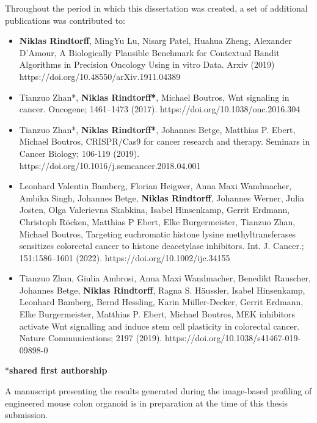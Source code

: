 \begin{flushleft}
Throughout the period in which this dissertation was created, a set of additional publications was contributed to: 
\begin{itemize} 
    \item \textbf{Niklas Rindtorff}, MingYu Lu, Nisarg Patel, Huahua Zheng, Alexander D'Amour, A Biologically Plausible Benchmark for Contextual Bandit Algorithms in Precision Oncology Using in vitro Data. Arxiv (2019) https://doi.org/10.48550/arXiv.1911.04389
    \item Tianzuo Zhan*, \textbf{Niklas Rindtorff*}, Michael Boutros, Wnt signaling in cancer. Oncogene; 1461–1473 (2017). https://doi.org/10.1038/onc.2016.304
    \item Tianzuo Zhan*, \textbf{Niklas Rindtorff*}, Johannes Betge, Matthias P. Ebert, Michael Boutros, CRISPR/Cas9 for cancer research and therapy. Seminars in Cancer Biology; 106-119 (2019). https://doi.org/10.1016/j.semcancer.2018.04.001
    \item Leonhard Valentin Bamberg, Florian Heigwer, Anna Maxi Wandmacher, Ambika Singh, Johannes Betge, \textbf{Niklas Rindtorff}, Johannes Werner, Julia Josten, Olga Valerievna Skabkina, Isabel Hinsenkamp, Gerrit Erdmann, Christoph Röcken, Matthias P Ebert, Elke Burgermeister, Tianzuo Zhan, Michael Boutros, Targeting euchromatic histone lysine methyltransferases
sensitizes colorectal cancer to histone deacetylase inhibitors. Int. J. Cancer.; 151:1586–1601 (2022). https://doi.org/10.1002/ijc.34155
    \item Tianzuo Zhan, Giulia Ambrosi, Anna Maxi Wandmacher, Benedikt Rauscher, Johannes Betge, \textbf{Niklas Rindtorff}, Ragna S. Häussler, Isabel Hinsenkamp, Leonhard Bamberg, Bernd Hessling, Karin Müller-Decker, Gerrit Erdmann, Elke Burgermeister, Matthias P. Ebert, Michael Boutros, MEK inhibitors activate Wnt signalling and induce stem cell plasticity in colorectal cancer. Nature Communications; 2197 (2019). https://doi.org/10.1038/s41467-019-09898-0
\end{itemize}
*\textbf{shared first authorship}
\bigbreak

A manuscript presenting the results generated during the image-based profiling of engineered mouse colon organoid is in preparation at the time of this thesis submission.
\end{flushleft}